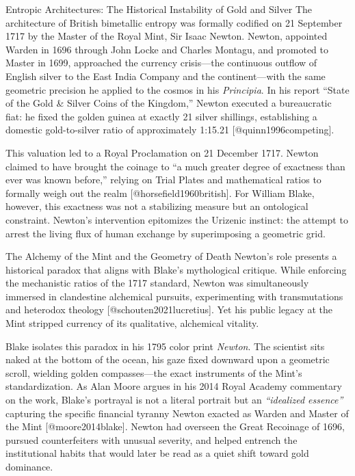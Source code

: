 \documentclass[
  ignorenonframetext,
]{beamer}
\author{\texorpdfstring{}{}}
\date{}
\begin{document}
\begin{frame}{Entropic Architectures: The Historical Instability of Gold
and Silver}
\protect{}\label{entropic-architectures-the-historical-instability-of-gold-and-silver}
The architecture of British bimetallic entropy was formally codified on
21 September 1717 by the Master of the Royal Mint, Sir Isaac Newton.
Newton, appointed Warden in 1696 through John Locke and Charles Montagu,
and promoted to Master in 1699, approached the currency crisis---the
continuous outflow of English silver to the East India Company and the
continent---with the same geometric precision he applied to the cosmos
in his \emph{Principia}. In his report ``State of the Gold \& Silver
Coins of the Kingdom,'' Newton executed a bureaucratic fiat: he fixed
the golden guinea at exactly 21 silver shillings, establishing a
domestic gold-to-silver ratio of approximately 1:15.21
{[}@quinn1996competing{]}.

This valuation led to a Royal Proclamation on 21 December 1717. Newton
claimed to have brought the coinage to ``a much greater degree of
exactness than ever was known before,'' relying on Trial Plates and
mathematical ratios to formally weigh out the realm
{[}@horsefield1960british{]}. For William Blake, however, this exactness
was not a stabilizing measure but an ontological constraint. Newton's
intervention epitomizes the Urizenic instinct: the attempt to arrest the
living flux of human exchange by superimposing a geometric grid.

\begin{block}{The Alchemy of the Mint and the Geometry of Death}
\protect{}\label{the-alchemy-of-the-mint-and-the-geometry-of-death}
Newton's role presents a historical paradox that aligns with Blake's
mythological critique. While enforcing the mechanistic ratios of the
1717 standard, Newton was simultaneously immersed in clandestine
alchemical pursuits, experimenting with transmutations and heterodox
theology {[}@schouten2021lucretius{]}. Yet his public legacy at the Mint
stripped currency of its qualitative, alchemical vitality.

Blake isolates this paradox in his 1795 color print \emph{Newton}. The
scientist sits naked at the bottom of the ocean, his gaze fixed downward
upon a geometric scroll, wielding golden compasses---the exact
instruments of the Mint's standardization. As Alan Moore argues in his
2014 Royal Academy commentary on the work, Blake's portrayal is not a
literal portrait but an \emph{``idealized essence''} capturing the
specific financial tyranny Newton exacted as Warden and Master of the
Mint {[}@moore2014blake{]}. Newton had overseen the Great Recoinage of
1696, pursued counterfeiters with unusual severity, and helped entrench
the institutional habits that would later be read as a quiet shift
toward gold dominance.


\end{block}
\end{frame}
\end{document}
